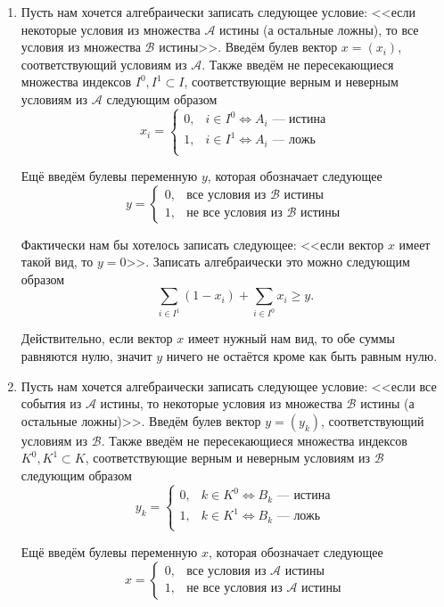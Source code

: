 \begin{enumerate}[nosep]
	\item Пусть нам хочется алгебраически записать следующее условие: <<если некоторые условия из множества $\mathcal{A}$ истины (а остальные ложны), то все условия из множества $\mathcal{B}$ истины>>. Введём булев вектор $x = (x_i)$, соответствующий условиям из $\mathcal{A}$. Также введём не пересекающиеся множества индексов $I^0, I^1 \subset I$, соответствующие верным и неверным условиям из $\mathcal{A}$ следующим образом
	\[
	x_i = \begin{cases}
		0,& i \in I^0 \Leftrightarrow \text{$A_i$ --- истина}\\
		1,& i \in I^1 \Leftrightarrow \text{$A_i$ --- ложь}\\
	\end{cases}
	\]
	
	Ещё введём булевы переменную $y$, которая обозначает следующее
	\[
	y = \begin{cases}
		0, &\text{все условия из $\mathcal{B}$ истины} \\
		1, &\text{не все условия из $\mathcal{B}$ истины}
	\end{cases}
	\]
	
	Фактически нам бы хотелось записать следующее: <<если вектор $x$ имеет такой вид, то $y = 0$>>. Записать алгебраически это можно следующим образом
	\[
	\sum_{i \in I^1}(1-x_i) + \sum_{i \in I^0}x_i \ge y.
	\]
	
	Действительно, если вектор $x$ имеет нужный нам вид, то обе суммы равняются нулю, значит $y$ ничего не остаётся кроме как быть равным нулю.
	
	\item  Пусть нам хочется алгебраически записать следующее условие: <<если все события из $\mathcal{A}$ истины, то некоторые условия из множества $\mathcal{B}$ истины (а остальные ложны)>>. Введём булев вектор $y = (y_k)$, соответствующий условиям из $\mathcal{B}$. Также введём не пересекающиеся множества индексов $K^0, K^1 \subset K$, соответствующие верным и неверным условиям из $\mathcal{B}$ следующим образом
	\[
	y_k = \begin{cases}
		0,& k \in K^0 \Leftrightarrow \text{$B_k$ --- истина}\\
		1,& k \in K^1 \Leftrightarrow \text{$B_k$ --- ложь}\\
	\end{cases}
	\]
	
	Ещё введём булевы переменную $x$, которая обозначает следующее
	\[
	x = \begin{cases}
		0, &\text{все условия из $\mathcal{A}$ истины} \\
		1, &\text{не все условия из $\mathcal{A}$ истины}
	\end{cases}
	\]
	

\end{enumerate}
